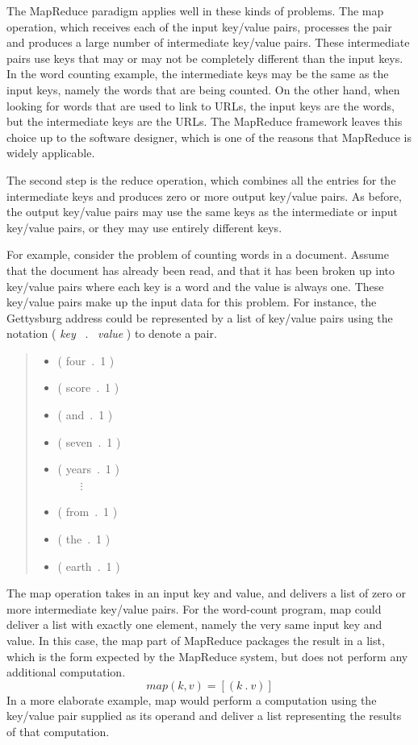 The MapReduce paradigm applies well in these kinds of problems.
The \textsf{map} operation, which receives each
of the input key/value pairs, processes the
pair and produces a large number of intermediate
key/value pairs.  These intermediate pairs use keys that may
or may not be completely different than the input keys.
In the word counting example, the intermediate keys may be the same
as the input keys, namely the words that are being counted.
On the other hand, when looking for words that are used to
link to URLs, the input keys are the words, but the
intermediate keys are the URLs. The MapReduce framework leaves
this choice up to the software designer, which is
one of the reasons that MapReduce is widely applicable.

The second step is the \textsf{reduce}
operation, which combines all the entries
for the intermediate keys and
produces zero or more output key/value pairs.  As before, the
output key/value pairs may use the same keys as the
intermediate or input key/value pairs, or they may use
entirely different keys.

For example, consider the problem of counting words in a
document.  Assume that the document has already been
read, and that it has been broken up into key/value pairs
where each key is a word and the value is always one. These
key/value pairs make up the input data for this problem. For
instance, the Gettysburg address could be represented by a
list of key/value pairs using the notation ( \emph{key} ~.~ \emph{value} )
to denote a pair.
\begin{quote}
\begin{itemize}
\item \textsf{( four~.~1 )}
\item \textsf{( score~.~1 )}
\item \textsf{( and~.~1 )}
\item \textsf{( seven~.~1 )}
\item \textsf{( years~.~1 )}\\~~~~$\vdots$
\item \textsf{( from~.~1 )}
\item \textsf{( the~.~1 )}
\item \textsf{( earth~.~1 )}
\end{itemize}
\end{quote}

The map operation takes in an input key and
value, and delivers a list of zero or more intermediate
key/value pairs.  For the word-count program, map could
deliver a list with exactly one element, namely
the very same input key and value.
In this case, the map part of MapReduce
packages the result in a list, which is
the form expected by the MapReduce system,
but does not perform any additional computation.
\begin{displaymath}
map(k, v) = [ ( k ~.~ v ) ]
\end{displaymath}
In a more elaborate example, map would perform
a computation using the key/value pair supplied as
its operand and deliver a list representing the results
of that computation.

